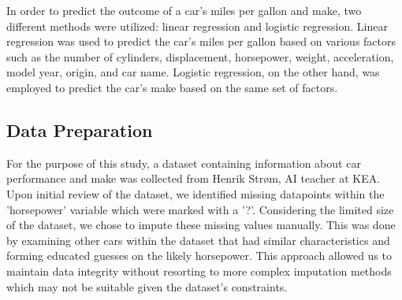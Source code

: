 \documentclass[a4paper, twocolumn]{article}
\begin{document}
In order to predict the outcome of a car's miles per gallon and make, two different methods were utilized: linear regression and logistic regression. Linear regression was used to predict the car's miles per gallon based on various factors such as the number of cylinders, displacement, horsepower, weight, acceleration, model year, origin, and car name. Logistic regression, on the other hand, was employed to predict the car's make based on the same set of factors.



\subsection{Data Preparation}

For the purpose of this study, a dataset containing information about car performance and make was collected from Henrik Strøm, AI teacher at KEA. Upon initial review of the dataset, we identified missing datapoints within the 'horsepower' variable which were marked with a '?'. Considering the limited size of the dataset, we chose to impute these missing values manually. This was done by examining other cars within the dataset that had similar characteristics and forming educated guesses on the likely horsepower. This approach allowed us to maintain data integrity without resorting to more complex imputation methods which may not be suitable given the dataset's constraints.
\end{document}
